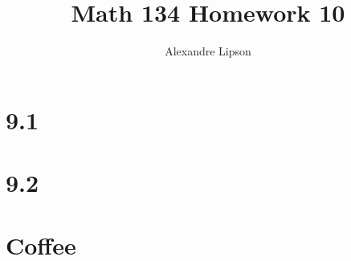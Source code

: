 \documentclass{article}
\title{Math 134 Homework 10}
\author{Alexandre Lipson}
\begin{document}
\maketitle

\section*{9.1}


\section*{9.2}


\section*{Coffee}

\end{document}

